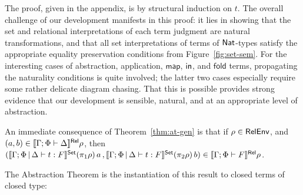 \documentclass[runningheads]{llncs}
\newcommand{\map}{\mathsf{map}}
\begin{document}
The proof, {\color{red} given in the appendix}, is by structural
induction on
$t$. The overall challenge of our development manifests in this proof:
it lies in showing that the set and relational interpretations of each
term judgment are natural transformations, and that all set
interpretations of terms of $\mathsf{Nat}$-types satisfy the appropriate
equality preservation conditions from Figure~\ref{fig:set-sem}.  For
the interesting cases of abstraction, application, $\map$, $\mathsf{in}$, and
$\mathsf{fold}$ terms, propagating the naturality conditions is quite
involved; the latter two cases especially require some rather delicate
diagram chasing. That this is possible provides strong evidence that
our development is sensible, natural, and at an appropriate level of
abstraction.

An immediate consequence of Theorem~\ref{thm:at-gen} is that
if $\rho \in \mathsf{RelEnv}$, and \,$(a, b) \in \llbracket{\Gamma; \Phi \vdash
  \Delta}\rrbracket^{\mathsf{Rel}} \rho$, then $(\llbracket{\Gamma; \Phi \,|\, \Delta \vdash t :
  F}\rrbracket^{\mathsf{Set}} (\pi_1 \rho) \,a \, , \llbracket{\Gamma; \Phi \,|\, \Delta \vdash t
  : F }\rrbracket^{\mathsf{Set}} (\pi_2 \rho) \,b) \in \llbracket{\Gamma; \Phi \vdash F}\rrbracket^{\mathsf{Rel}} \rho$. 
\begin{comment}
The following theorem is an immediate consequence of
Theorem~\ref{thm:at-gen}. The Abstraction Theorem is its instantiation
to closed terms of closed type.
\begin{theorem}\label{thm:at-gen-rel}
  If
  $\rho \in \relenv$,
  and \,$(a, b) \in \relsem{\Gamma; \Phi \vdash \Delta} \rho$,
  then\\
  $(\setsem{\Gamma; \Phi \,|\, \Delta \vdash t : F} (\pi_1 \rho) \,a \, ,
      \setsem{\Gamma; \Phi \,|\, \Delta \vdash t : F } (\pi_2 \rho) \,b) \in 
    \relsem{\Gamma; \Phi \vdash F} \rho$
\end{theorem}
\end{comment}
The Abstraction Theorem is the instantiation of this result to closed
terms of closed type:
\end{document}
